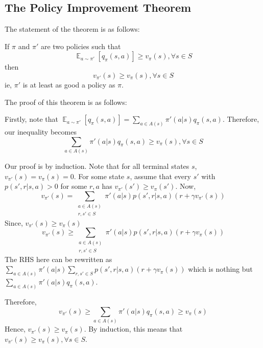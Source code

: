 \documentclass[12pt]{report}
\begin{document}
\subsection{The Policy Improvement Theorem}
The statement of the theorem is as follows:

If $\pi$ and $\pi'$ are two policies such that
\begin{equation}
    \mathop{\mathbb{E}}_{a \sim \pi'}\left[q_{\pi}(s, a)\right] \geq v_{\pi}(s), \forall s \in S
\end{equation}
then
\begin{equation}
    v_{\pi'}(s) \geq v_{\pi}(s), \forall s \in S
\end{equation}
ie, $\pi'$ is at least as good a policy as $\pi$. 

The proof of this theorem is as follows:

Firstly, note that $\mathop{\mathbb{E}}_{a \sim \pi'}\left[q_{\pi}(s, a)\right] = \sum\limits_{a \in A(s)} \pi'(a | s) q_{\pi}(s, a)$. Therefore, our inequality becomes
\begin{equation}
    \sum\limits_{a \in A(s)} \pi'(a | s) q_{\pi}(s, a) \geq v_{\pi}(s), \forall s \in S
\end{equation}

Our proof is by induction. Note that for all terminal states $s$, $v_{\pi'}(s) = v_{\pi}(s) = 0$. For some state $s$, assume that every $s'$ with $p(s', r | s, a) > 0$ for some $r, a$ has $v_{\pi'}(s') \geq v_{\pi}(s')$.
Now,
\begin{equation}
    v_{\pi'}(s) = \sum\limits_{\substack{a \in A(s)\\r, s' \in S}} \pi'(a | s) p(s', r | s, a) (r + \gamma v_{\pi'}(s))
\end{equation}
Since, $v_{\pi'}(s) \geq v_{\pi}(s)$
\begin{equation}
    v_{\pi'}(s) \geq \sum\limits_{\substack{a \in A(s)\\r, s' \in S}} \pi'(a | s) p(s', r | s, a) (r + \gamma v_{\pi}(s))
\end{equation}
The RHS here can be rewritten as $\sum\limits_{a \in A(s)} \pi'(a | s) \sum\limits_{r, s' \in S} p(s', r | s, a) (r + \gamma v_{\pi}(s))$ which is nothing but $\sum\limits_{a \in A(s)} \pi'(a | s) q_{\pi}(s, a)$.

Therefore,
\begin{equation}
    v_{\pi'}(s) \geq \sum\limits_{a \in A(s)} \pi'(a | s) q_{\pi}(s, a) \geq v_{\pi}(s)
\end{equation}
Hence, $v_{\pi'}(s) \geq v_{\pi}(s)$. By induction, this means that $v_{\pi'}(s) \geq v_{\pi}(s), \forall s \in S$.
\end{document}
